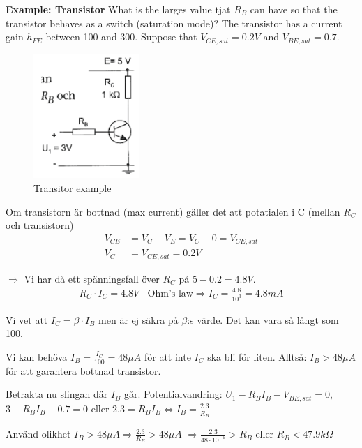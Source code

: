 \documentclass{article}
\begin{document}
\textbf{Example: Transistor}
What is the larges value tjat $R_B$ can have so that the transistor 
behaves as a switch (saturation mode)? The transistor has a current gain
$h_{FE}$ between 100 and 300. Suppose that $V_{CE,sat}=0.2V$ and
$V_{BE,sat}=0.7$.
\begin{figure}[h]
    \centering
    \includegraphics[width=4cm]{image/example-transistor.png}
    \caption{Transitor example}
\end{figure}

Om transistorn är bottnad (max current) gäller det att potatialen i C (mellan $R_C$
och transistorn)
\begin{align*}
    V_{CE} &= V_C - V_E = V_C - 0 = V_{CE,sat} \\
    V_C &= V_{CE,sat} = 0.2V
\end{align*}

$\Rightarrow$ Vi har då ett spänningsfall över $R_C$ på $5-0.2=4.8V$. \newline
\begin{align*}
    R_C\cdot I_C = 4.8V \;\; \text{ Ohm's law} \Rightarrow I_C = \frac{4.8}{10^3} = 4.8mA
\end{align*}

Vi vet att $I_C=\beta\cdot I_B$ men är ej säkra på $\beta$:s värde. Det kan vara så 
långt som 100. \newline

Vi kan behöva $I_B=\frac{I_C}{100}=48\mu A$ för att inte $I_C$ ska bli för liten.
Alltså: $I_B>48\mu A$ för att garantera bottnad transistor. \newline

Betrakta nu slingan där $I_B$ går. \newline
Potentialvandring: $U_1-R_BI_B-V_{BE,sat}= 0$, $3-R_BI_B-0.7=0$ \newline
eller $2.3=R_BI_B \Leftrightarrow I_B=\frac{2.3}{R_B}$ \newline

Använd olikhet $I_B>48\mu A \Rightarrow \frac{2.3}{R_B}>48\mu A$ $\Rightarrow \frac{2.3}{48\cdot10^{-6}}>R_B$ eller $R_B<47.9k\Omega$
\end{document}
